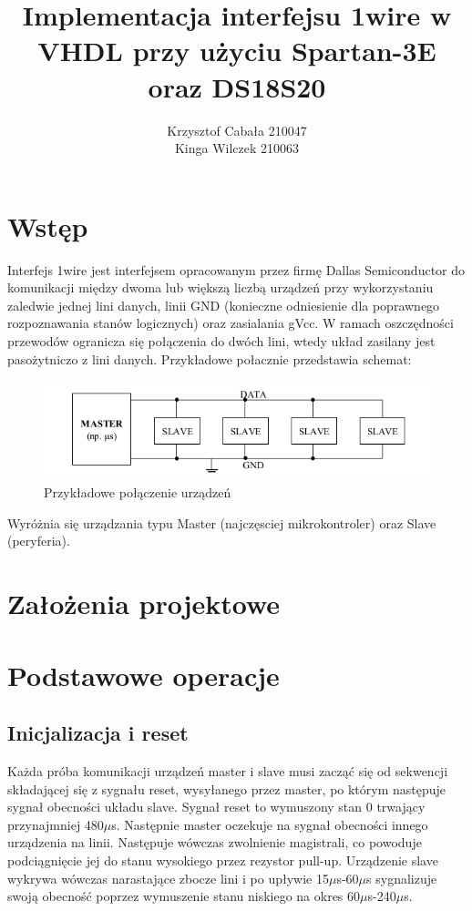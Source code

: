 \documentclass[a4paper]{article}
\title{\vspace{80mm}Implementacja interfejsu 1wire w VHDL przy użyciu Spartan-3E oraz DS18S20}
\author{Krzysztof Cabała 210047\\ Kinga Wilczek 210063\vspace{110mm}}
\begin{document}
\maketitle
\thispagestyle{empty}

\tableofcontents
\newpage
\listoffigures

\newpage
\section{Wstęp}
Interfejs 1wire jest interfejsem opracowanym przez firmę Dallas Semiconductor do komunikacji między dwoma lub większą liczbą urządzeń przy wykorzystaniu zaledwie jednej lini danych, linii GND (konieczne odniesienie dla poprawnego rozpoznawania stanów logicznych) oraz zasialania gVcc. 
W ramach oszczędności przewodów ogranicza się połączenia do dwóch lini, wtedy układ zasilany jest pasożytniczo z lini danych.
Przykładowe połacznie przedstawia schemat:

\begin{figure}[h]
\begin{center}
\includegraphics[scale=0.3]{graphics/idea.png}
\end{center}
\label{schemonewire}
\caption{Przykładowe połączenie urządzeń}
\end{figure}

Wyróżnia się urządzania typu Master (najczęsciej mikrokontroler) oraz Slave (peryferia).

\section{Założenia projektowe}
\section{Podstawowe operacje}



\subsection{Inicjalizacja i reset}

Każda próba komunikacji urządzeń master i slave musi zacząć się od sekwencji składającej się z sygnału reset, wysyłanego przez master, po którym następuje sygnał obecności układu slave. Sygnał reset to wymuszony stan 0 trwający przynajmniej 480$\mu$s. Następnie master oczekuje na sygnał obecności innego urządzenia na linii. Następuje wówczas zwolnienie magistrali, co powoduje podciągnięcie jej do stanu wysokiego przez rezystor pull-up. Urządzenie slave wykrywa wówczas narastające zbocze lini i po upływie 15$\mu$s-60$\mu$s sygnalizuje swoją obecność poprzez wymuszenie stanu niskiego na okres 60$\mu$s-240$\mu$s.
\end{document}
